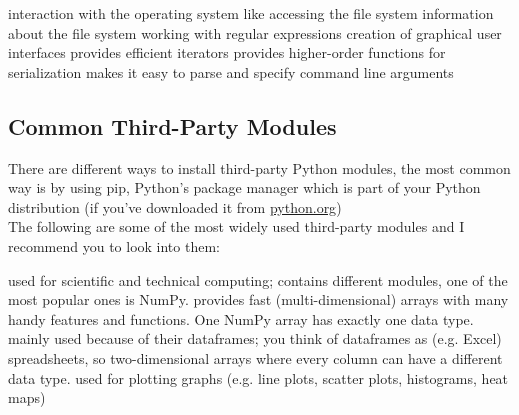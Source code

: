         \begin{enumerate}
             interaction with the operating system like accessing the file system
             information about the file system
             working with regular expressions
             creation of graphical user interfaces
             provides efficient iterators
             provides higher-order functions
             for serialization
             makes it easy to parse and specify command line arguments
        \end{enumerate}
    
    \subsection{Common Third-Party Modules}
        There are different ways to install third-party Python modules, the most common way is by using pip, Python's package manager which is part of your Python distribution (if you've downloaded it from \href{https://python.org}{python.org})\\
        The following are some of the most widely used third-party modules and I recommend you to look into them:
        \begin{enumerate}
             used for scientific and technical computing; contains different modules, one of the most popular ones is NumPy. 
             provides fast (multi-dimensional) arrays with many handy features and functions. One NumPy array has exactly one data type.
             mainly used because of their dataframes; you think of dataframes as (e.g. Excel) spreadsheets, so two-dimensional arrays where every column can have a different data type.
             used for plotting graphs (e.g. line plots, scatter plots, histograms, heat maps)
        \end{enumerate}
    
